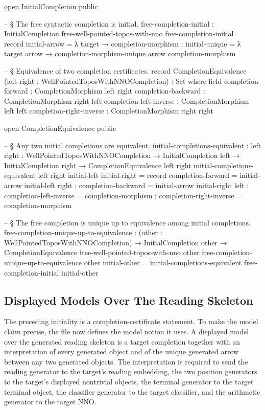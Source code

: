 \documentclass[11pt]{article}
\begin{document}
\begin{code}
open InitialCompletion public

-- § The free syntactic completion is initial.
free-completion-initial : InitialCompletion free-well-pointed-topos-with-nno
free-completion-initial = record
  { initial-arrow  = λ target → completion-morphism
  ; initial-unique = λ target arrow → completion-morphism-unique arrow completion-morphism
  }

-- § Equivalence of two completion certificates.
record CompletionEquivalence
  (left right : WellPointedToposWithNNOCompletion) : Set where
  field
    completion-forward  : CompletionMorphism left right
    completion-backward : CompletionMorphism right left
    completion-left-inverse  : CompletionMorphism left left
    completion-right-inverse : CompletionMorphism right right

open CompletionEquivalence public

-- § Any two initial completions are equivalent.
initial-completions-equivalent :
  {left right : WellPointedToposWithNNOCompletion} →
  InitialCompletion left →
  InitialCompletion right →
  CompletionEquivalence left right
initial-completions-equivalent {left} {right} initial-left initial-right = record
  { completion-forward       = initial-arrow initial-left right
  ; completion-backward      = initial-arrow initial-right left
  ; completion-left-inverse  = completion-morphism
  ; completion-right-inverse = completion-morphism
  }

-- § The free completion is unique up to equivalence among initial completions.
free-completion-unique-up-to-equivalence :
  (other : WellPointedToposWithNNOCompletion) →
  InitialCompletion other →
  CompletionEquivalence free-well-pointed-topos-with-nno other
free-completion-unique-up-to-equivalence other initial-other =
  initial-completions-equivalent free-completion-initial initial-other
\end{code}

\subsection{Displayed Models Over The Reading Skeleton}

The preceding initiality is a completion-certificate statement.  To make
the model claim precise, the file now defines the model notion it uses.
A displayed model over the generated reading skeleton is a target
completion together with an interpretation of every generated object and
of the unique generated arrow between any two generated objects.  The
interpretation is required to send the reading generator to the target's
reading embedding, the two position generators to the target's displayed
nontrivial objects, the terminal generator to the target terminal object,
the classifier generator to the target classifier, and the arithmetic
generator to the target NNO.
\end{document}
